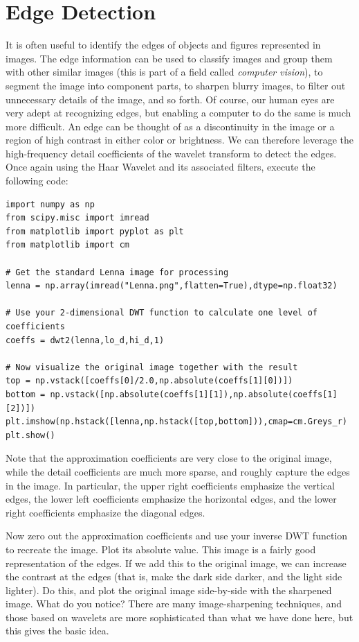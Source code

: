 \section*{Edge Detection}
It is often useful to identify the edges of objects and figures
represented in images. The edge information can be used to classify images
and group them with other similar images (this is part of a field called
\textit{computer vision}), to segment the image into component parts, to
sharpen blurry images, to filter out unnecessary details of the image,
and so forth. Of course, our human eyes are very adept at recognizing edges,
but enabling a computer to do the same is much more difficult. An edge can
be thought of as a discontinuity in the image or a region of high contrast
in either color or brightness. We can therefore leverage the high-frequency
detail coefficients of the wavelet transform to detect the edges. Once again
using the Haar Wavelet and its associated filters, execute the following
code:
\begin{lstlisting}
import numpy as np
from scipy.misc import imread
from matplotlib import pyplot as plt
from matplotlib import cm

# Get the standard Lenna image for processing
lenna = np.array(imread("Lenna.png",flatten=True),dtype=np.float32)

# Use your 2-dimensional DWT function to calculate one level of coefficients
coeffs = dwt2(lenna,lo_d,hi_d,1)

# Now visualize the original image together with the result
top = np.vstack([coeffs[0]/2.0,np.absolute(coeffs[1][0])])
bottom = np.vstack([np.absolute(coeffs[1][1]),np.absolute(coeffs[1][2])])
plt.imshow(np.hstack([lenna,np.hstack([top,bottom])),cmap=cm.Greys_r)
plt.show()
\end{lstlisting}

Note that the approximation coefficients are very close to the original
image, while the detail coefficients are much more sparse, and roughly
capture the edges in the image. In particular, the upper right coefficients
emphasize the vertical edges, the lower left coefficients emphasize the
horizontal edges, and the lower right coefficients emphasize the diagonal
edges.

\begin{problem}
Now zero out the approximation coefficients and use your inverse DWT
function to recreate the image. Plot its absolute value. This image is
a fairly good representation of the edges. If we add this to the original
image, we can increase the contrast at the edges (that is, make the dark
side darker, and the light side lighter). Do this, and plot the original
image side-by-side with the sharpened image. What do you notice? There
are many image-sharpening techniques, and those based on wavelets
are more sophisticated than what we have done here, but this gives the
basic idea.
\end{problem}

